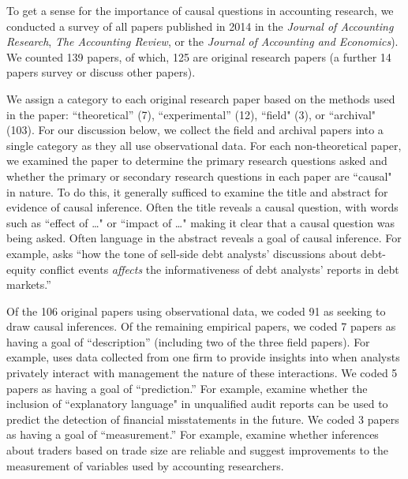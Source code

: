 \documentclass[11pt]{amsart}
\begin{document}

To get a sense for the importance of causal questions in accounting research,
we conducted a survey of all papers published in 2014 in the  \textit{Journal of Accounting Research}, \textit{The Accounting Review}, or the \textit{Journal of Accounting and Economics}).
We counted 139 papers, of which, 125 are original research papers (a further 14 papers survey or discuss other papers).

We assign a category to each original research paper based on the methods used in the paper: ``theoretical''  (7), ``experimental'' (12), ``field" (3), or ``archival"  (103). 
For our discussion below, we collect the field and archival papers into a single category as they all use observational data.
For each non-theoretical paper, we examined the paper to determine the primary research questions asked and whether the primary or secondary research questions in each paper are
``causal" in nature.
To do this, it generally sufficed to examine the title and abstract for evidence of causal inference. 
Often the title reveals a causal question, with words such as  ``effect of \dots" or ``impact of \dots"  
\citep[e.g.][]{Cohen:2014jl,Clorproell:2014cv} making it clear that a causal question was being asked. 
Often language in the abstract reveals a goal of causal inference. 
For example, \citet{deFranco:2014ct} asks ``how the tone of sell-side debt analysts' discussions about debt-equity conflict events \emph{affects} the informativeness of debt analysts’ reports in debt markets.''

Of the 106 original papers using observational data, we coded 91 as seeking to draw causal inferences.
Of the remaining empirical papers, we coded 7 papers as having a goal of ``description'' (including two of the three field papers). 
For example, \citet{Soltes:2013ba} uses data collected from one firm to provide insights into when analysts privately interact with management the nature of these interactions.
We coded 5 papers as having a goal of ``prediction.'' 
For example, \citet{Czerney:2014bv} examine whether the inclusion of ``explanatory language" in unqualified audit reports can be used to predict the detection of financial misstatements in the future.
We coded 3 papers as having a goal of ``measurement.'' 
For example, \citet{Cready:2014ji} examine whether inferences about traders based on trade size are reliable and suggest improvements to the measurement of variables used by accounting researchers. 
\end{document}
